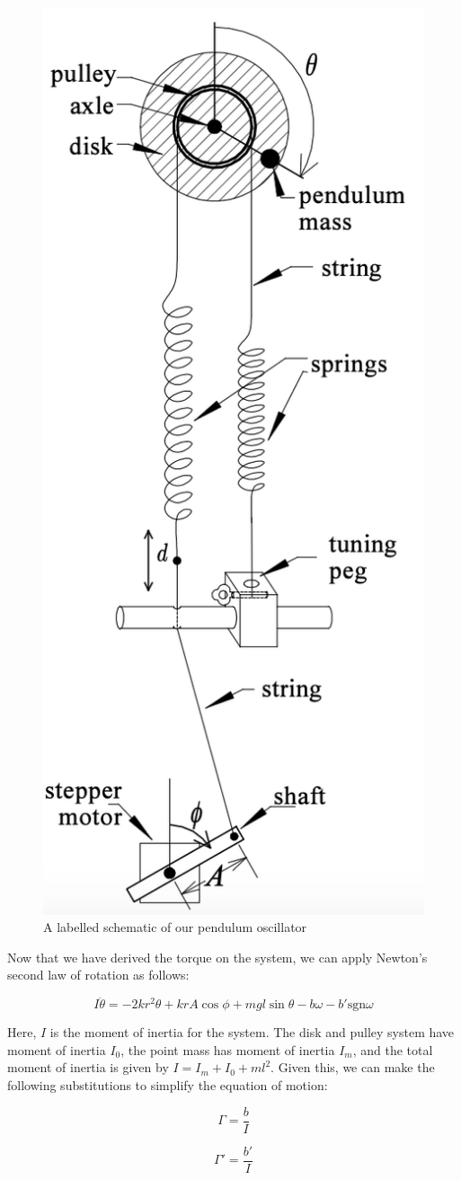 \documentclass[twocolumn,amsmath,amssymb,pra, floatfix]{revtex4-2}
\begin{document}
\begin{figure}[H]
    \centering
    \includegraphics[width = 0.4\linewidth]{images/apparatus_schematic.png}
    \caption{A labelled schematic of our pendulum oscillator}
    \label{fig:apparatus_schematic}
\end{figure}

Now that we have derived the torque on the system, we can apply Newton's second law of rotation as follows:

\begin{equation}
    I\ddot{\theta}=-2kr^{2}\theta+krA\cos{\phi}+mgl\sin{\theta} - b\omega -b'  \mathrm{sgn}{\omega}
    \label{eq:1}
\end{equation}

Here, $I$ is the moment of inertia for the system. The disk and pulley system have moment of inertia $I_{0}$, the point mass has moment of inertia $I_{m}$, and the total moment of inertia is given by $I = I_{m} + I_{0} + ml^{2}$. Given this, we can make the following substitutions to simplify the equation of motion:

\begin{equation}
    \Gamma = \frac{b}{I}
    \label{eq:2}
\end{equation}

\begin{equation}
    \Gamma' = \frac{b'}{I}
    \label{eq:3}
\end{equation}
\end{document}
